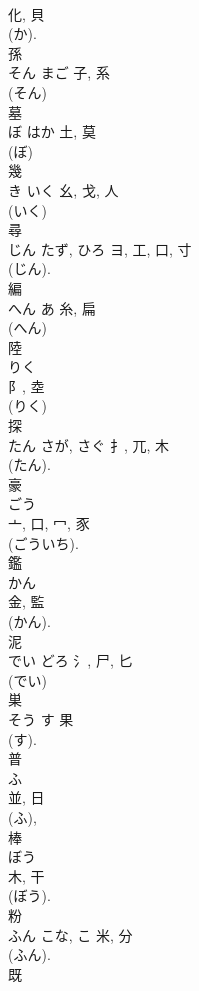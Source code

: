 \documentclass[8pt]{extreport}
\begin{document}
\begin{CJK}{UTF8}{min}
\\	化, 貝	
\\	(か). 
\\	孫	
\\	そん	まご	子, 系	
\\	(そん) 
\\	墓	
\\	ぼ	はか	土, 莫	
\\	(ぼ) 
\\	幾	
\\	き	いく	幺, 戈, 人	
\\	(いく) 
\\	尋	
\\	じん	たず, ひろ	ヨ, 工, 口, 寸	
\\	(じん). 
\\	編	
\\	へん	あ	糸, 扁	
\\	(へん) 
\\	陸	
\\	りく	
\\	阝, 坴	
\\	(りく) 
\\	探	
\\	たん	さが, さぐ	扌, 兀, 木	
\\	(たん). 
\\	豪	
\\	ごう	
\\	亠, 口, 冖, 豕	
\\	(ごういち). 
\\	鑑	
\\	かん	
\\	金, 監	
\\	(かん). 
\\	泥	
\\	でい	どろ	氵, 尸, 匕	
\\	(でい) 
\\	巣	
\\	そう	す	果		
\\	(す). 
\\	普	
\\	ふ	
\\	並, 日	
\\	(ふ), 
\\	棒	
\\	ぼう	
\\	木, 干		
\\	(ぼう). 
\\	粉	
\\	ふん	こな, こ	米, 分	
\\	(ふん). 
\\	既	

\end{CJK}
\end{document}

